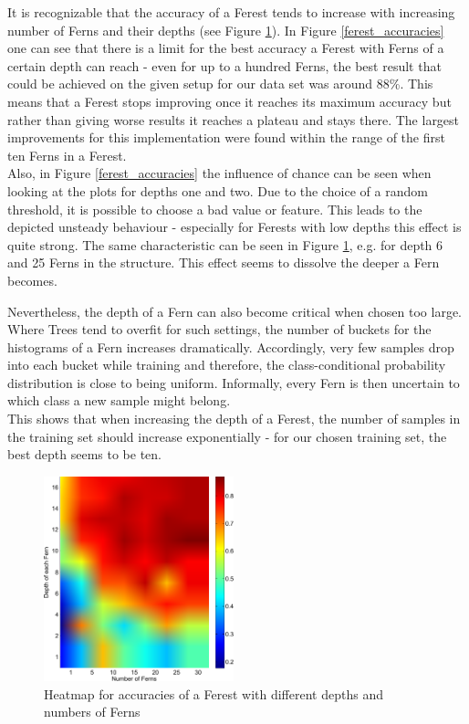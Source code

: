 \documentclass[twocolumn]{article}
\begin{document}
It is recognizable that the accuracy of a Ferest tends to increase with increasing number of Ferns and their depths (see Figure \ref{ferest_heatmap}). In Figure \ref{ferest_accuracies} one can see that there is a limit for the best accuracy a Ferest with Ferns of a certain depth can reach - even for up to a hundred Ferns, the best result that could be achieved on the given setup for our data set was around 88\%. This means that a Ferest stops improving once it reaches its maximum accuracy but rather than giving worse results it reaches a plateau and stays there. The largest improvements for this implementation were found within the range of the first ten Ferns in a Ferest.\\
Also, in Figure \ref{ferest_accuracies} the influence of chance can be seen when looking at the plots for depths one and two. Due to the choice of a random threshold, it is possible to choose a bad value or feature. This leads to the depicted unsteady behaviour - especially for Ferests with low depths this effect is quite strong. The same characteristic can be seen in Figure \ref{ferest_heatmap}, e.g. for depth 6 and 25 Ferns in the structure. This effect seems to dissolve the deeper a Fern becomes.

Nevertheless, the depth of a Fern can also become critical when chosen too large. Where Trees tend to overfit for such settings, the number of buckets for the histograms of a Fern increases dramatically. Accordingly, very few samples drop into each bucket while training and therefore, the class-conditional probability distribution is close to being uniform. Informally, every Fern is then uncertain to which class a new sample might belong.\\
This shows that when increasing the depth of a Ferest, the number of samples in the training set should increase exponentially - for our chosen training set, the best depth seems to be ten.

\begin{figure}[h] 
\centering
\includegraphics[width=0.49\textwidth]{Diagrams/heatmap_randFerns_16_30}
\caption{Heatmap for accuracies of a Ferest with different depths and numbers of Ferns}
\label{ferest_heatmap}
\end{figure}
\end{document}
